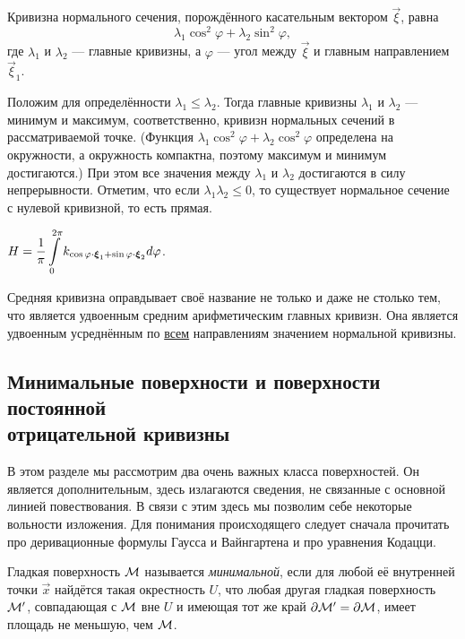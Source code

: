 \begin{theorem}
	Кривизна нормального сечения, порождённого касательным вектором $\vec{\xi}$, равна
	\[
		\lambda_1\cos^2\varphi + \lambda_2\sin^2\varphi,
	\]
	где $\lambda_1$ и $\lambda_2$ --- главные кривизны, а $\varphi$ --- угол между $\vec{\xi}$ и главным направлением $\vec{\xi}_1$.
\end{theorem}

Положим для определённости $\lambda_1 \leqslant \lambda_2$. Тогда главные кривизны $\lambda_1$ и $\lambda_2$ --- минимум и максимум, соответственно, кривизн нормальных сечений в рассматриваемой точке. (Функция $\lambda_1\cos^2\varphi + \lambda_2\cos^2\varphi$ определена на окружности, а окружность компактна, поэтому максимум и минимум достигаются.) При этом все значения между $\lambda_1$ и $\lambda_2$ достигаются в силу непрерывности. Отметим, что если $\lambda_1\lambda_2 \leqslant 0$, то существует нормальное сечение с нулевой кривизной, то есть прямая.

\begin{corollary}
	$\displaystyle H = \frac{1}{\pi}\int\limits_0^{2\pi}k_{\cos\varphi \cdot \boldsymbol{\xi}_1 + \sin\varphi \cdot \boldsymbol{\xi}_2}d\varphi$.
\end{corollary}

Средняя кривизна оправдывает своё название не только и даже не столько тем, что является удвоенным средним арифметическим главных кривизн. Она является удвоенным усреднённым по \underline{всем} направлениям значением нормальной кривизны.

\subsection{Минимальные поверхности и поверхности постоянной\\ отрицательной кривизны}

В этом разделе мы рассмотрим два очень важных класса поверхностей. Он является дополнительным, здесь излагаются сведения, не связанные с основной линией повествования. В связи с этим здесь мы позволим себе некоторые вольности изложения. Для понимания происходящего следует сначала прочитать про деривационные формулы Гаусса и Вайнгартена и про уравнения Кодацци.

\begin{definition}
	Гладкая поверхность $\mathcal{M}$ называется \textit{минимальной}, если для любой её внутренней точки $\vec{x}$ найдётся такая окрестность $U$, что любая другая гладкая поверхность $\mathcal{M}^\prime$, совпадающая с $\mathcal{M}$ вне $U$ и имеющая тот же край $\partial\mathcal{M}^\prime = \partial\mathcal{M}$, имеет площадь не меньшую, чем $\mathcal{M}$.
\end{definition}

